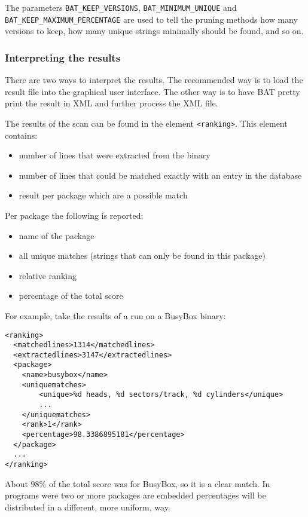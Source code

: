 \documentclass[10pt]{article}
\begin{document}
The parameters \texttt{BAT\_KEEP\_VERSIONS}, \texttt{BAT\_MINIMUM\_UNIQUE} and
\texttt{BAT\_KEEP\_MAXIMUM\_PERCENTAGE} are used to tell the pruning methods
how many versions to keep, how many unique strings minimally should be found,
and so on.

\subsubsection{Interpreting the results}

There are two ways to interpret the results. The recommended way is to load the
result file into the graphical user interface. The other way is to have BAT
pretty print the result in XML and further process the XML file.

The results of the scan can be found in the element \texttt{<ranking>}. This
element contains:

\begin{itemize}
\item number of lines that were extracted from the binary
\item number of lines that could be matched exactly with an entry in the
database
\item result per package which are a possible match
\end{itemize}

Per package the following is reported:

\begin{itemize}
\item name of the package
\item all unique matches (strings that can only be found in this package)
\item relative ranking
\item percentage of the total score
\end{itemize}

For example, take the results of a run on a BusyBox binary:

\begin{verbatim}
<ranking>
  <matchedlines>1314</matchedlines>
  <extractedlines>3147</extractedlines>
  <package>
    <name>busybox</name>
    <uniquematches>
        <unique>%d heads, %d sectors/track, %d cylinders</unique>
        ...
    </uniquematches>
    <rank>1</rank>
    <percentage>98.3386895181</percentage>
  </package>
  ...
</ranking>
\end{verbatim}

About 98\% of the total score was for BusyBox, so it is a clear match. In
programs were two or more packages are embedded percentages will be distributed
in a different, more uniform, way.
\end{document}
